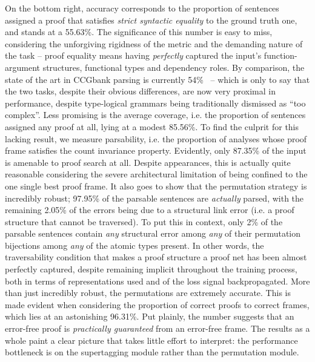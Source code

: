 On the bottom right, accuracy corresponds to the proportion of sentences assigned a proof that satisfies \textit{strict syntactic equality} to the ground truth one, and stands at a 55.63\%.
The significance of this number is easy to miss, considering the unforgiving rigidness of the metric and the demanding nature of the task -- proof equality means having \textit{perfectly} captured the input's function-argument structures, functional types and dependency roles.
By comparison, the state of the art in CCGbank parsing is currently 54\%~\cite{DBLP:journals/corr/abs-2109-10044} -- which is only to say that the two tasks, despite their obvious differences, are now very proximal in performance, despite type-logical grammars being traditionally dismissed as ``too complex''.
Less promising is the average coverage, i.e. the proportion of sentences assigned any proof at all, lying at a modest 85.56\%.
To find the culprit for this lacking result, we measure parsability, i.e. the proportion of analyses whose proof frame satisfies the count invariance property.
Evidently, only 87.35\% of the input is amenable to proof search at all.
Despite appearances, this is actually quite reasonable considering the severe architectural limitation of being confined to the one single best proof frame.
It also goes to show that the permutation strategy is incredibly robust; 97.95\% of the parsable sentences are \textit{actually} parsed, with the remaining 2.05\% of the errors being due to a structural link error (i.e. a proof structure that cannot be traversed).
To put this in context, only 2\% of the parsable sentences contain \textit{any} structural error among \textit{any} of their permutation bijections among \textit{any} of the atomic types present.
In other words, the traversability condition that makes a proof structure a proof net has been almost perfectly captured, despite remaining implicit throughout the training process, both in terms of representations used and of the loss signal backpropagated.
More than just incredibly robust, the permutations are extremely accurate.
This is made evident when considering the proportion of correct proofs to correct frames, which lies at an astonishing 96.31\%.
Put plainly, the number suggests that an error-free proof is \textit{practically guaranteed} from an error-free frame.
The results as a whole paint a clear picture that takes little effort to interpret: the performance bottleneck is on the supertagging module rather than the permutation module.

